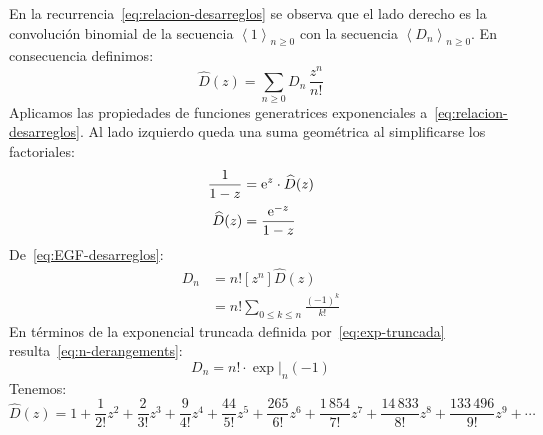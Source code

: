   En la recurrencia~\eqref{eq:relacion-desarreglos}
  se observa que el lado derecho
  es la convolución binomial
  de la secuencia \(\left\langle 1 \right\rangle_{n \ge 0}\)
  con la secuencia \(\left\langle D_n \right\rangle_{n \ge 0}\).
  En consecuencia definimos:
  \begin{equation*}
    \widehat{D}(z)
      = \sum_{n \ge 0} D_n \, \frac{z^n}{n!}
  \end{equation*}
  Aplicamos las propiedades de funciones generatrices exponenciales%
  a~\eqref{eq:relacion-desarreglos}.
  Al lado izquierdo queda una suma geométrica
  al simplificarse los factoriales:
  \begin{align}
    \frac{1}{1 - z}
      &= \mathrm{e}^z \cdot \widehat{D}(z) \notag \\
    \widehat{D}(z)
      &= \frac{\mathrm{e}^{-z}}{1 - z}
	\label{eq:EGF-desarreglos}
	\index{desarreglo!funcion generatriz@función generatriz}
  \end{align}
  De~\eqref{eq:EGF-desarreglos}:
  \begin{align*}
    D_n
      &= n! \left[ z^n \right] \widehat{D}(z) \\
      &= n! \sum_{0 \le k \le n} \! \frac{(-1)^k}{k!}
  \end{align*}
  En términos de la exponencial truncada
  definida por~\eqref{eq:exp-truncada}
  resulta~\eqref{eq:n-derangements}:%
  \begin{equation*}
    D_n
      = n! \cdot \exp \rvert_n (-1)
  \end{equation*}
  Tenemos:
  \begin{equation*}
    \widehat{D}(z)
      = 1 + \frac{1}{2!} z^2 + \frac{2}{3!} z^3
	  + \frac{9}{4!} z^4 + \frac{44}{5!} z^5
	  + \frac{265}{6!} z^6 + \frac{1\,854}{7!} z^7
	  + \frac{14\,833}{8!} z^8 + \frac{133\,496}{9!} z^9
	  + \dotsb
  \end{equation*}

